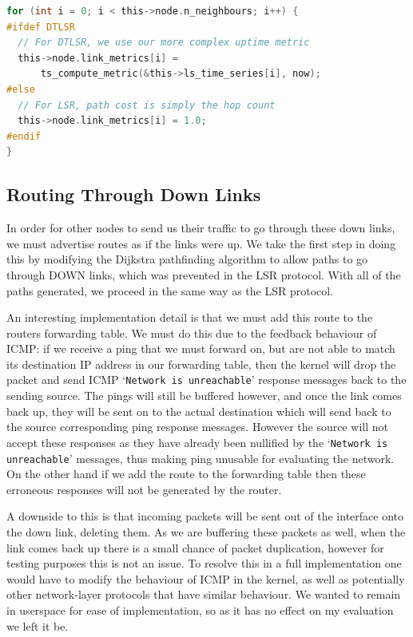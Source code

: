 \documentclass[withindex,glossary,openany]{cam-thesis}
\begin{document}
\begin{minipage}{1\textwidth} \centering
\begin{lstlisting}[language=C, label=preprocessor_switch, frame=tb, caption=Example of preprocessor switch for DTLSR modifications]
for (int i = 0; i < this->node.n_neighbours; i++) {
#ifdef DTLSR
  // For DTLSR, we use our more complex uptime metric
  this->node.link_metrics[i] =
      ts_compute_metric(&this->ls_time_series[i], now);
#else
  // For LSR, path cost is simply the hop count
  this->node.link_metrics[i] = 1.0;
#endif
}
\end{lstlisting}
\end{minipage}

\subsection{Routing Through Down Links}

In order for other nodes to send us their traffic to go through these down links, we must advertise routes as if the links were up. We take the first step in doing this by modifying the Dijkstra pathfinding algorithm to allow paths to go through DOWN links, which was prevented in the LSR protocol. With all of the paths generated, we proceed in the same way as the LSR protocol.

An interesting implementation detail is that we must add this route to the routers forwarding table. We must do this due to the feedback behaviour of ICMP: if we receive a ping that we must forward on, but are not able to match its destination IP address in our forwarding table, then the kernel will drop the packet and send ICMP `\texttt{Network is unreachable}' response messages back to the sending source. The pings will still be buffered however, and once the link comes back up, they will be sent on to the actual destination which will send back to the source corresponding ping response messages. However the source will not accept these responses as they have already been nullified by the `\texttt{Network is unreachable}' messages, thus making ping unusable for evaluating the network. On the other hand if we add the route to the forwarding table then these erroneous responses will not be generated by the router.

A downside to this is that incoming packets will be sent out of the interface onto the down link, deleting them. As we are buffering these packets as well, when the link comes back up there is a small chance of packet duplication, however for testing purposes this is not an issue. To resolve this in a full implementation one would have to modify the behaviour of ICMP in the kernel, as well as potentially other network-layer protocols that have similar behaviour. We wanted to remain in userspace for ease of implementation, so as it has no effect on my evaluation we left it be.
\end{document}
